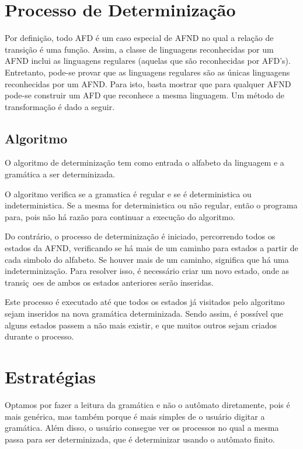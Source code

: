 \documentclass[10pt,a4paper,titlepage]{hitec}
\begin{document}
\section*{Processo de Determinização}

Por definição, todo AFD é um caso especial de AFND no qual a relação de transição é uma função.
Assim, a classe de linguagens reconhecidas por um AFND inclui as linguagens regulares (aquelas que são reconhecidas por AFD's).
Entretanto, pode-se provar que as linguagens regulares são as únicas linguagens reconhecidas por um AFND. 
Para isto, basta mostrar que para qualquer AFND pode-se construir um AFD que reconhece a mesma linguagem. 
Um método de transformação é dado a seguir.

\subsection*{Algoritmo}

O algoritmo de determinização tem como entrada o alfabeto da linguagem e a gramática a ser determinizada.

O algoritmo verifica se a gramatica é regular e se é deterministica ou indeterministica. Se a mesma for deterministica ou não regular, então o programa para, pois não há razão para continuar  a execução do algoritmo.

Do contrário, o processo de determinização é iniciado, percorrendo todos os estados da AFND, verificando se há mais de um caminho para estados a partir de cada simbolo do alfabeto. Se houver mais de um caminho, significa que há uma indeterminização. Para resolver isso, é necessário criar um novo estado, onde as transiç~oes de ambos os estados anteriores serão inseridas.

Este processo é executado até que todos os estados já visitados pelo algoritmo sejam inseridos na nova gramática determinizada. Sendo assim, é possível que alguns estados passem a não mais existir, e que muitos outros sejam criados durante o processo.

\section*{Estratégias}

Optamos por fazer a leitura da gramática e não o autômato diretamente, pois é mais genérica, mas também porque é mais simples de o usuário digitar a gramática. Além disso, o usuário consegue ver os processos no qual a mesma passa para ser determinizada, que é determinizar usando o autômato finito.	
\end{document}
